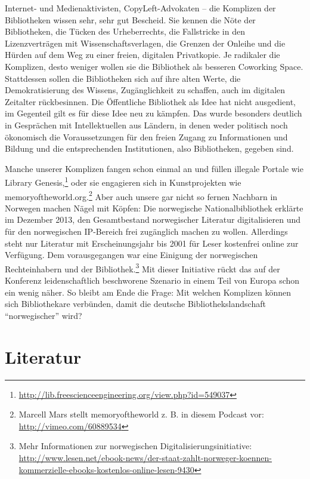 \documentclass[a4paper,
fontsize=11pt,
oneside,
numbers=noperiodatend,
parskip=half-,
bibliography=totoc,
final
]{scrartcl}
\begin{document}
Internet- und Medienaktivisten, CopyLeft-Advokaten -- die Komplizen der
Bibliotheken wissen sehr, sehr gut Bescheid. Sie kennen die Nöte der
Bibliotheken, die Tücken des Urheberrechts, die Fallstricke in den
Lizenzverträgen mit Wissenschaftsverlagen, die Grenzen der Onleihe und
die Hürden auf dem Weg zu einer freien, digitalen Privatkopie. Je
radikaler die Komplizen, desto weniger wollen sie die Bibliothek als
besseren Coworking Space. Stattdessen sollen die Bibliotheken sich auf
ihre alten Werte, die Demokratisierung des Wissens, Zugänglichkeit zu
schaffen, auch im digitalen Zeitalter rückbesinnen. Die Öffentliche
Bibliothek als Idee hat nicht ausgedient, im Gegenteil gilt es für diese
Idee neu zu kämpfen. Das wurde besonders deutlich in Gesprächen mit
Intellektuellen aus Ländern, in denen weder politisch noch ökonomisch
die Voraussetzungen für den freien Zugang zu Informationen und Bildung
und die entsprechenden Institutionen, also Bibliotheken, gegeben sind.

Manche unserer Komplizen fangen schon einmal an und füllen illegale
Portale wie Library Genesis,\footnote{\url{http://lib.freescienceengineering.org/view.php?id=549037}}
oder sie engagieren sich in Kunstprojekten wie
memoryoftheworld.org.\footnote{Marcell Mars stellt memoryoftheworld z.
  B. in diesem Podcast vor: \url{http://vimeo.com/60889534}} Aber auch
unsere gar nicht so fernen Nachbarn in Norwegen machen Nägel mit Köpfen:
Die norwegische Nationalbibliothek erklärte im Dezember 2013, den
Gesamtbestand norwegischer Literatur digitalisieren und für den
norwegischen IP-Bereich frei zugänglich machen zu wollen. Allerdings
steht nur Literatur mit Erscheinungsjahr bis 2001 für Leser kostenfrei
online zur Verfügung. Dem vorausgegangen war eine Einigung der
norwegischen Rechteinhabern und der Bibliothek.\footnote{Mehr
  Informationen zur norwegischen Digitalisierungsinitiative:
  \url{http://www.lesen.net/ebook-news/der-staat-zahlt-norweger-koennen-kommerzielle-ebooks-kostenlos-online-lesen-9430}}
Mit dieser Initiative rückt das auf der Konferenz leidenschaftlich
beschworene Szenario in einem Teil von Europa schon ein wenig näher. So
bleibt am Ende die Frage: Mit welchen Komplizen können sich
Bibliothekare verbünden, damit die deutsche Bibliothekslandschaft
\enquote{norwegischer} wird?

\section*{Literatur}\label{literatur}
\end{document}
